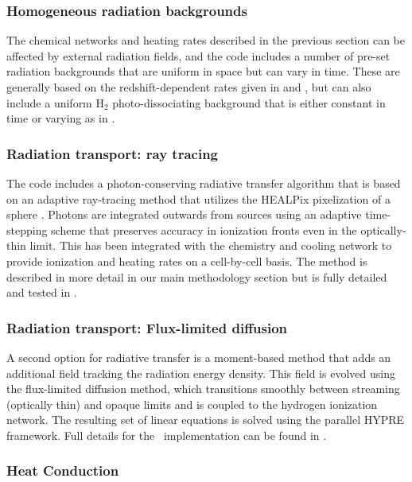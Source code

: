 \subsubsection{Homogeneous radiation backgrounds}

The chemical networks and heating rates described in the previous
section can be affected by external radiation fields, and the code
includes a number of pre-set radiation backgrounds that are uniform in
space but can vary in time.  These are generally based on the
redshift-dependent rates given in \citet{1996ApJ...461...20H} and
\citet{2012ApJ...746..125H}, but can also include a uniform H$_2$
photo-dissociating background that is either constant in time or
varying as in \citet{WiseAbel05}.

\subsubsection{Radiation transport: ray tracing}

The code includes a photon-conserving radiative transfer algorithm
that is based on an adaptive ray-tracing method that utilizes the
HEALPix pixelization of a sphere \citep{AbelWandelt02}.  Photons are
integrated outwards from sources using an adaptive time-stepping
scheme that preserves accuracy in ionization fronts even in the
optically-thin limit.  This has been integrated with the chemistry and
cooling network to provide ionization and heating rates on a
cell-by-cell basis.  The method is described in more detail in our
main methodology section but is fully detailed and tested in
\citet{Wise11_Moray}.

\subsubsection{Radiation transport: Flux-limited diffusion}

A second option for radiative transfer is a moment-based method that
adds an additional field tracking the radiation energy density.
This field is evolved using the flux-limited diffusion method, which
transitions smoothly between streaming (optically thin) and opaque
limits and is coupled to the hydrogen ionization network.  The
resulting set of linear equations is solved using the parallel HYPRE
framework.  Full details for the \enzo\ implementation can be found in
\citet{ReynoldsHayesPaschosNorman2009}.

\subsubsection{Heat Conduction}

